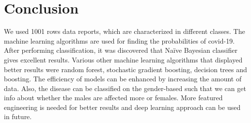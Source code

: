 \documentclass[conference]{IEEEtran}
\begin{document}
\section{Conclusion}
 We used 1001 rows data reports, which are characterized in different classes. The machine learning algorithms are used for finding the probabilities of covid-19. After performing classification, it was discovered that Naïve Bayesian classifier gives excellent results. Various other machine learning algorithms that displayed better results were random forest, stochastic gradient boosting, decision trees and boosting. The efficiency of models can be enhanced by increasing the amount of data. Also, the disease can be classified on the gender-based such that we can get info about whether the males are affected more or females. More featured engineering is needed for better results and deep learning approach can be used in future.




\end{document}
